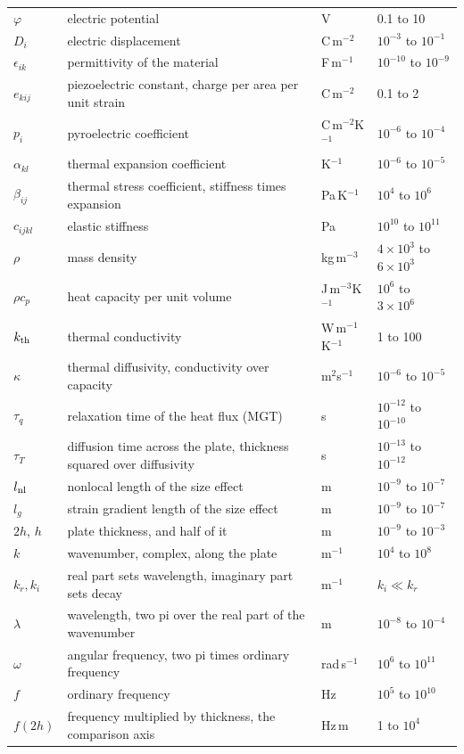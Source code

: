 \documentclass[11pt]{article}
\begin{document}
\begin{center}
\begin{tabular}{p{1.9cm}p{6.0cm}p{2.4cm}p{2.6cm}}
$\varphi$ & electric potential & V & 0.1 to 10\\
$D_i$ & electric displacement & C\,m$^{-2}$ & $10^{-3}$ to $10^{-1}$\\
$\epsilon_{ik}$ & permittivity of the material & F\,m$^{-1}$ & $10^{-10}$ to $10^{-9}$\\
$e_{kij}$ & piezoelectric constant, charge per area per unit strain & C\,m$^{-2}$ & 0.1 to 2\\
$p_i$ & pyroelectric coefficient & C\,m$^{-2}$K$^{-1}$ & $10^{-6}$ to $10^{-4}$\\
$\alpha_{kl}$ & thermal expansion coefficient & K$^{-1}$ & $10^{-6}$ to $10^{-5}$\\
$\beta_{ij}$ & thermal stress coefficient, stiffness times expansion & Pa\,K$^{-1}$ & $10^{4}$ to $10^{6}$\\
$c_{ijkl}$ & elastic stiffness & Pa & $10^{10}$ to $10^{11}$\\
$\rho$ & mass density & kg\,m$^{-3}$ & $4\times10^{3}$ to $6\times10^{3}$\\
$\rho c_p$ & heat capacity per unit volume & J\,m$^{-3}$K$^{-1}$ & $10^{6}$ to $3\times10^{6}$\\
$k_{\rm th}$ & thermal conductivity & W\,m$^{-1}$K$^{-1}$ & 1 to 100\\
$\kappa$ & thermal diffusivity, conductivity over capacity & m$^2$s$^{-1}$ & $10^{-6}$ to $10^{-5}$\\
$\tau_q$ & relaxation time of the heat flux (MGT) & s & $10^{-12}$ to $10^{-10}$\\
$\tau_T$ & diffusion time across the plate, thickness squared over diffusivity & s & $10^{-13}$ to $10^{-12}$\\
$l_{\rm nl}$ & nonlocal length of the size effect & m & $10^{-9}$ to $10^{-7}$\\
$l_g$ & strain gradient length of the size effect & m & $10^{-9}$ to $10^{-7}$\\
$2h$, $h$ & plate thickness, and half of it & m & $10^{-9}$ to $10^{-3}$\\
$k$ & wavenumber, complex, along the plate & m$^{-1}$ & $10^{4}$ to $10^{8}$\\
$k_r,k_i$ & real part sets wavelength, imaginary part sets decay & m$^{-1}$ & $k_i\ll k_r$\\
$\lambda$ & wavelength, two pi over the real part of the wavenumber & m & $10^{-8}$ to $10^{-4}$\\
$\omega$ & angular frequency, two pi times ordinary frequency & rad\,s$^{-1}$ & $10^{6}$ to $10^{11}$\\
$f$ & ordinary frequency & Hz & $10^{5}$ to $10^{10}$\\
$f(2h)$ & frequency multiplied by thickness, the comparison axis & Hz\,m & 1 to $10^{4}$\\
\bottomrule
\end{tabular}
\end{center}
\end{document}
